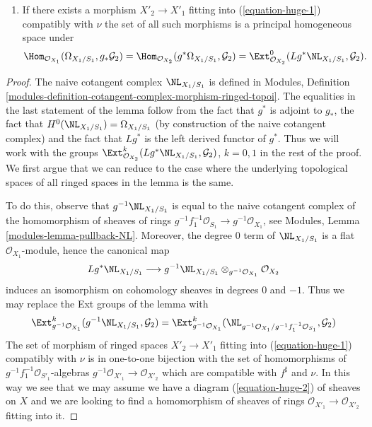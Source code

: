 \begin{lemma}
\begin{enumerate}
$\Ext^1_{\mathcal{O}_{X_2}}(Lg^*\NL_{X_1/S_1}, \mathcal{G}_2)$
whose vanishing is a necessary and sufficient condition for the existence
of a morphism of ringed spaces $X'_2 \to X'_1$ fitting into
(\ref{equation-huge-1}) compatibly with $\nu$.
\item If there exists a morphism $X'_2 \to X'_1$ fitting into
(\ref{equation-huge-1}) compatibly with $\nu$ the set of all such morphisms
is a principal homogeneous space under
$$
\Hom_{\mathcal{O}_{X_1}}(\Omega_{X_1/S_1}, g_*\mathcal{G}_2) =
\Hom_{\mathcal{O}_{X_2}}(g^*\Omega_{X_1/S_1}, \mathcal{G}_2) =
\Ext^0_{\mathcal{O}_{X_2}}(Lg^*\NL_{X_1/S_1}, \mathcal{G}_2).
$$
\end{enumerate}
\end{lemma}

\begin{proof}

The naive cotangent complex $\NL_{X_1/S_1}$ is defined in Modules, Definition
\ref{modules-definition-cotangent-complex-morphism-ringed-topoi}.
The equalities in the last statement of the lemma follow from
the fact that $g^*$ is adjoint to $g_*$, the fact that
$H^0(\NL_{X_1/S_1}) = \Omega_{X_1/S_1}$ (by construction of the
naive cotangent complex) and the fact that $Lg^*$ is the left
derived functor of $g^*$. Thus we will work with the groups
$\Ext^k_{\mathcal{O}_{X_2}}(Lg^*\NL_{X_1/S_1}, \mathcal{G}_2)$,
$k = 0, 1$ in the rest of the proof. We first argue that we can reduce
to the case where the underlying topological spaces of all ringed
spaces in the lemma is the same.

\medskip\noindent
To do this, observe that $g^{-1}\NL_{X_1/S_1}$ is equal to the naive
cotangent complex of the homomorphism of sheaves of rings
$g^{-1}f_1^{-1}\mathcal{O}_{S_1} \to g^{-1}\mathcal{O}_{X_1}$, see
Modules, Lemma \ref{modules-lemma-pullback-NL}.
Moreover, the degree $0$ term of $\NL_{X_1/S_1}$ is a flat
$\mathcal{O}_{X_1}$-module, hence the canonical map
$$
Lg^*\NL_{X_1/S_1}
\longrightarrow
g^{-1}\NL_{X_1/S_1} \otimes_{g^{-1}\mathcal{O}_{X_1}} \mathcal{O}_{X_2}
$$
induces an isomorphism on cohomology sheaves in degrees $0$ and $-1$.
Thus we may replace the Ext groups of the lemma with
$$
\Ext^k_{g^{-1}\mathcal{O}_{X_1}}(g^{-1}\NL_{X_1/S_1}, \mathcal{G}_2) =
\Ext^k_{g^{-1}\mathcal{O}_{X_1}}(
\NL_{g^{-1}\mathcal{O}_{X_1}/g^{-1}f_1^{-1}\mathcal{O}_{S_1}}, \mathcal{G}_2)
$$
The set of morphism of ringed spaces $X'_2 \to X'_1$ fitting into
(\ref{equation-huge-1}) compatibly with $\nu$
is in one-to-one bijection with
the set of homomorphisms of $g^{-1}f_1^{-1}\mathcal{O}_{S'_1}$-algebras
$g^{-1}\mathcal{O}_{X'_1} \to \mathcal{O}_{X'_2}$ which are compatible with
$f^\sharp$ and $\nu$. In this way we see that we may assume we have a
diagram (\ref{equation-huge-2}) of sheaves on $X$ and we are looking to
find a homomorphism of sheaves of rings
$\mathcal{O}_{X'_1} \to \mathcal{O}_{X'_2}$ fitting into it.


\end{proof}

